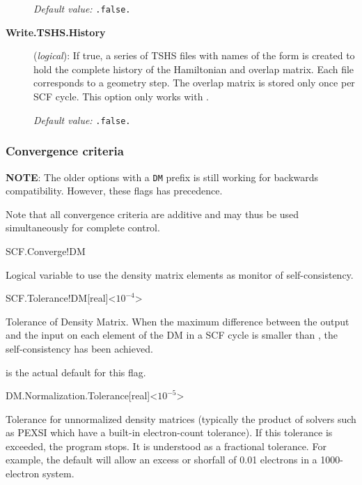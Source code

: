 \begin{description}
\textit{Default value:} \texttt{.false.}

\item[\textbf{Write.TSHS.History}] (\textit{logical}):
%
%
%
If true, a series of TSHS files with names of the form
 is created to hold the complete history of the
Hamiltonian and overlap matrix. Each file corresponds to a geometry
step. The overlap matrix is stored only once per SCF cycle. This
option only works with \tsiesta.

\textit{Default value:} \texttt{.false.}

\end{description}


\subsubsection{Convergence criteria}

\textbf{NOTE}: The older options with a \texttt{DM} prefix is still
working for backwards compatibility. However, these flags has
precedence.

Note that all convergence criteria are additive and may thus be used
simultaneously for complete control.

\begin{fdflogicalT}{SCF.Converge!DM}

  Logical variable to use the density matrix elements as monitor
  of self-consistency.
  
\end{fdflogicalT}

\begin{fdfentry}{SCF.Tolerance!DM}[real]<$10^{-4}$>

  Tolerance of Density Matrix.
  When the maximum difference between the output and the input on each
  element of the DM in a SCF cycle is smaller than
  , the self-consistency has been achieved.


  \note {} is the actual default for this flag.

\end{fdfentry}

\begin{fdfentry}{DM.Normalization.Tolerance}[real]<$10^{-5}$>

  Tolerance for unnormalized density matrices (typically the product
  of solvers such as PEXSI which have a built-in electron-count
  tolerance). If this tolerance is exceeded, the program stops. It is
  understood as a fractional tolerance. For example, the default will
  allow an excess or shorfall of 0.01 electrons in a 1000-electron
  system.

\end{fdfentry}



